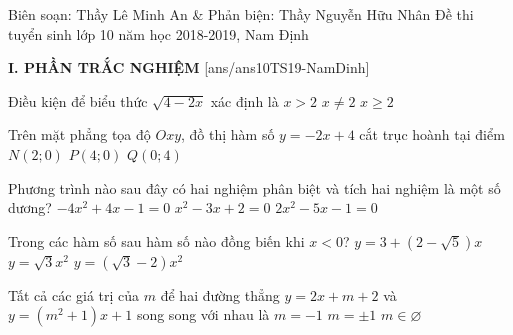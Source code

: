 \begin{name}
{Biên soạn: Thầy Lê Minh An \& Phản biện: Thầy Nguyễn Hữu Nhân}
{Đề thi tuyển sinh lớp 10 năm học 2018-2019, Nam Định}
\end{name}
\noindent\textbf{I. PHẦN TRẮC NGHIỆM}
\setcounter{ex}{0}
[ans/ans10TS19-NamDinh]
\begin{ex}%
Điều kiện để biểu thức $\sqrt{4-2x}$ xác định là
{$x>2$}
{$x\neq 2$}
{$x\ge 2$}
\end{ex}

\begin{ex}%
Trên mặt phẳng tọa độ $Oxy$, đồ thị hàm số $y=-2x+4$ cắt trục hoành tại điểm
{\True $N(2;0)$}
{$P(4;0)$}
{$Q(0;4)$}
\end{ex}

\begin{ex}%
Phương trình nào sau đây có hai nghiệm phân biệt và tích hai nghiệm là một số dương?
{$-4x^2+4x-1=0$}
{\True $x^2-3x+2=0$}
{$2x^2-5x-1=0$}
\end{ex}

\begin{ex}%
Trong các hàm số sau hàm số nào đồng biến khi $x<0$?
{$y=3+\left(2-\sqrt{5}\right)x$}
{$y=\sqrt{3}x^2$}
{\True $y=\left(\sqrt{3}-2\right) x^2$}
\end{ex}

\begin{ex}%
Tất cả các giá trị của $m$ để hai đường thẳng $y=2x+m+2$ và $y=\left(m^2+1\right)x+1$ song song với nhau là
{$m=-1$}
{$m=\pm 1$}
{$m\in\varnothing$}
\end{ex}

